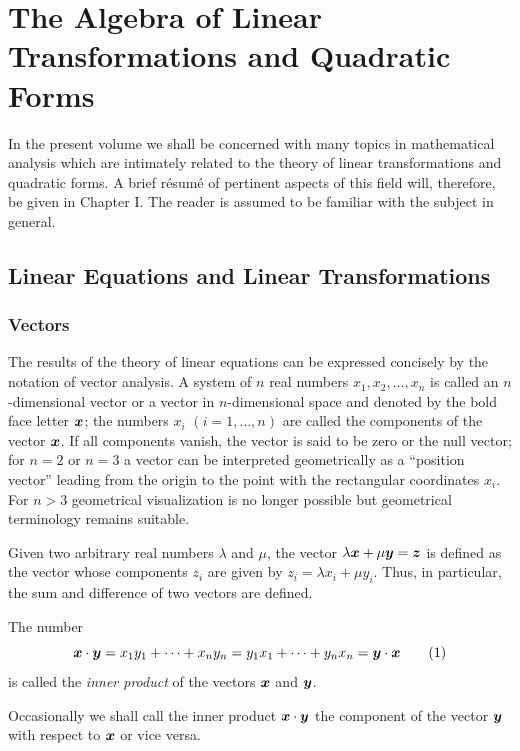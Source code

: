 \chapter{The Algebra of Linear Transformations and Quadratic Forms}

In the present volume we shall be concerned with many topics in mathematical analysis which are intimately related to the theory of linear transformations and quadratic forms. A brief résumé of pertinent aspects of this field will, therefore, be given in Chapter I. The reader is assumed to be familiar with the subject in general.

\section{Linear Equations and Linear Transformations}

\subsection{Vectors}
The results of the theory of linear equations can be expressed concisely by the notation of vector analysis. A system of $n$ real numbers $x_1,x_2,\ldots,x_n$ is called an $n$-dimensional vector or a vector in $n$-dimensional space and denoted by the bold face letter $\bm{x}$; the numbers $x_i$ $(i=1,\ldots,n)$ are called the components of the vector $\bm{x}$. If all components vanish, the vector is said to be zero or the null vector; for $n=2$ or $n=3$ a vector can be interpreted geometrically as a ``position vector'' leading from the origin to the point with the rectangular coordinates $x_i$. For $n>3$ geometrical visualization is no longer possible but geometrical terminology remains suitable.

Given two arbitrary real numbers $\lambda$ and $\mu$, the vector $\lambda\bm{x}+\mu\bm{y}=\bm{z}$ is defined as the vector whose components $z_i$ are given by $z_i=\lambda x_i+\mu y_i$. Thus, in particular, the sum and difference of two vectors are defined.

The number
\begin{equation*}
\bm{x}\cdot\bm{y}=x_1y_1+\cdots+x_ny_n=y_1x_1+\cdots+y_nx_n=\bm{y}\cdot\bm{x}
\tag{1}
\end{equation*}
is called the \emph{inner product} of the vectors $\bm{x}$ and $\bm{y}$.

Occasionally we shall call the inner product $\bm{x}\cdot\bm{y}$ the component of the vector $\bm{y}$ with respect to $\bm{x}$ or vice versa.

